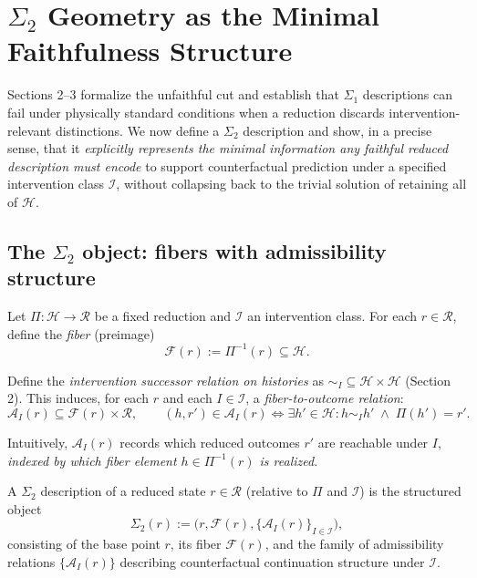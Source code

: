 \section{\texorpdfstring{$\Sigma_2$}{Sigma-2} Geometry as the Minimal Faithfulness Structure}
\label{sec:sigma2}

Sections 2--3 formalize the unfaithful cut and establish that $\Sigma_1$ descriptions
can fail under physically standard conditions when a reduction discards intervention-relevant
distinctions. We now define a $\Sigma_2$ description and show, in a precise sense, that it
\emph{explicitly represents the minimal information any faithful reduced description must encode}
to support counterfactual prediction under a specified intervention class $\mathcal{I}$,
without collapsing back to the trivial solution of retaining all of $\mathcal{H}$.

\subsection{The \texorpdfstring{$\Sigma_2$}{Sigma-2} object: fibers with admissibility structure}

Let $\Pi:\mathcal{H}\to\mathcal{R}$ be a fixed reduction and $\mathcal{I}$ an intervention class.
For each $r\in\mathcal{R}$, define the \emph{fiber} (preimage)
\begin{equation}
\mathcal{F}(r) := \Pi^{-1}(r) \subseteq \mathcal{H}.
\end{equation}

Define the \emph{intervention successor relation on histories} as $\sim_I \subseteq \mathcal{H}\times \mathcal{H}$
(Section 2). This induces, for each $r$ and each $I\in\mathcal{I}$, a \emph{fiber-to-outcome relation}:
\begin{equation}
\mathcal{A}_I(r) \subseteq \mathcal{F}(r)\times\mathcal{R},
\qquad
(h, r')\in\mathcal{A}_I(r)
\iff
\exists h' \in \mathcal{H}: h \sim_I h' \;\wedge\; \Pi(h')=r'.
\end{equation}

Intuitively, $\mathcal{A}_I(r)$ records which reduced outcomes $r'$ are reachable under $I$,
\emph{indexed by which fiber element $h\in\Pi^{-1}(r)$ is realized}.

\begin{definition}[Σ$_2$ description]
A $\Sigma_2$ description of a reduced state $r\in\mathcal{R}$ (relative to $\Pi$ and $\mathcal{I}$)
is the structured object
\begin{equation}
\Sigma_2(r) := \bigl(r, \mathcal{F}(r), \{\mathcal{A}_I(r)\}_{I\in\mathcal{I}}\bigr),
\end{equation}
consisting of the base point $r$, its fiber $\mathcal{F}(r)$, and the family of admissibility
relations $\{\mathcal{A}_I(r)\}$ describing counterfactual continuation structure under $\mathcal{I}$.
\end{definition}

